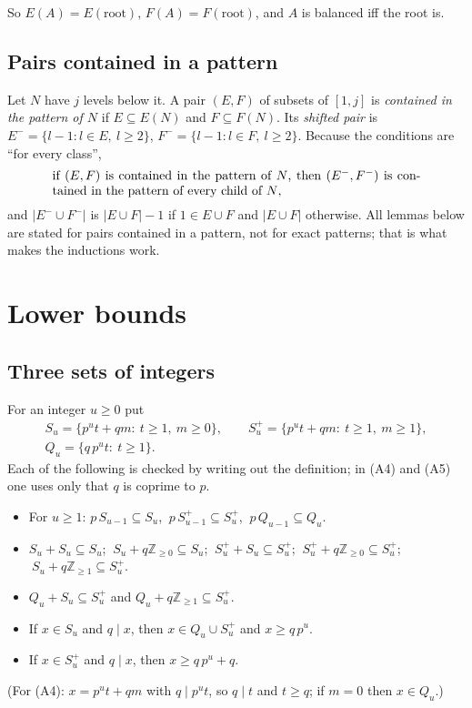 \documentclass[11pt,a4paper]{amsart}
\theoremstyle{definition}
\theoremstyle{remark}
\newcommand{\Z}{\mathbb{Z}}
\newcommand{\Sp}{S^{+}}
\begin{document}
So $E(A)=E(\mathrm{root})$, $F(A)=F(\mathrm{root})$, and $A$ is balanced iff the root is.

\subsection*{Pairs contained in a pattern} Let $N$ have $j$ levels below it. A pair $(E,F)$ of subsets of
$[1,j]$ is \emph{contained in the pattern of $N$} if $E\subseteq E(N)$ and $F\subseteq F(N)$. Its
\emph{shifted pair} is $E^-=\{l-1:l\in E,\ l\ge 2\}$, $F^-=\{l-1:l\in F,\ l\ge2\}$. Because the conditions
are ``for every class'',
\begin{equation}\label{eq:shift}
\parbox{0.84\textwidth}{if $(E,F)$ is contained in the pattern of $N$, then $(E^-,F^-)$ is contained in
the pattern of every child of $N$,}
\end{equation}
and $|E^-\cup F^-|$ is $|E\cup F|-1$ if $1\in E\cup F$ and $|E\cup F|$ otherwise. All lemmas below are stated
for pairs contained in a pattern, not for exact patterns; that is what makes the inductions work.

\section{Lower bounds}\label{sec:lower}

\subsection{Three sets of integers} For an integer $u\ge0$ put
\begin{gather*} S_u=\{p^ut+qm:\ t\ge1,\ m\ge0\},\qquad \Sp_u=\{p^ut+qm:\ t\ge1,\ m\ge1\},\\ Q_u=\{q\,p^ut:\ t\ge1\}. \end{gather*}
Each of the following is checked by writing out the definition; in (A4) and (A5) one uses only that $q$ is coprime to $p$.
\begin{itemize}
\item[(A1)] For $u\ge1$: $p\,S_{u-1}\subseteq S_u$, $\ p\,\Sp_{u-1}\subseteq\Sp_u$, $\ p\,Q_{u-1}\subseteq Q_u$.
\item[(A2)] $S_u+S_u\subseteq S_u$; $\ S_u+q\Z_{\ge0}\subseteq S_u$; $\ \Sp_u+S_u\subseteq\Sp_u$;
 $\ \Sp_u+q\Z_{\ge0}\subseteq\Sp_u$; $\ S_u+q\Z_{\ge1}\subseteq\Sp_u$.
\item[(A3)] $Q_u+S_u\subseteq\Sp_u$ and $Q_u+q\Z_{\ge1}\subseteq\Sp_u$.
\item[(A4)] If $x\in S_u$ and $q\mid x$, then $x\in Q_u\cup\Sp_u$ and $x\ge q\,p^u$.
\item[(A5)] If $x\in\Sp_u$ and $q\mid x$, then $x\ge q\,p^u+q$.
\end{itemize}
(For (A4): $x=p^ut+qm$ with $q\mid p^ut$, so $q\mid t$ and $t\ge q$; if $m=0$ then $x\in Q_u$.)
\end{document}
